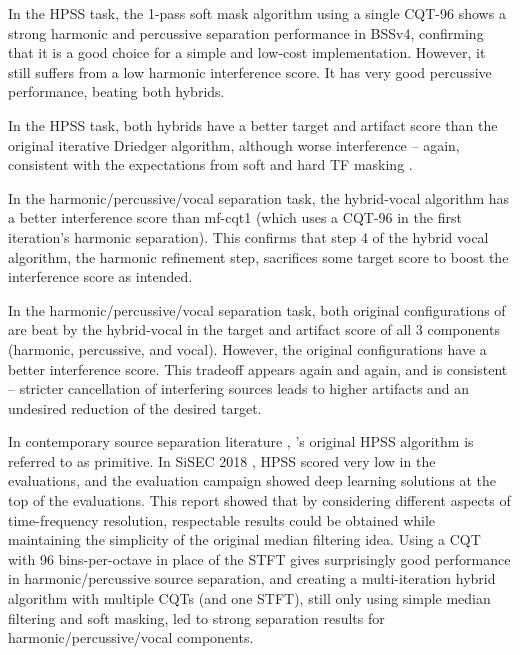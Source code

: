 \documentclass[letter,12pt]{article}
\newenvironment{tight_itemize}{
\begin{itemize}
  \setlength{\itemsep}{0pt}
  \setlength{\parskip}{0pt}
}{\end{itemize}}
\begin{document}
\begin{tight_itemize}
	\item
		In the HPSS task, the 1-pass soft mask algorithm using a single CQT-96 shows a strong harmonic and percussive separation performance in BSSv4, confirming that it is a good choice for a simple and low-cost implementation. However, it still suffers from a low harmonic interference score. It has very good percussive performance, beating both hybrids.
	\item
		In the HPSS task, both hybrids have a better target and artifact score than the original iterative Driedger algorithm, although worse interference -- again, consistent with the expectations from soft and hard TF masking \cite{masking}.
	\item
		In the harmonic/percussive/vocal separation task, the hybrid-vocal algorithm has a better interference score than mf-cqt1 (which uses a CQT-96 in the first iteration's harmonic separation). This confirms that step 4 of the hybrid vocal algorithm, the harmonic refinement step, sacrifices some target score to boost the interference score as intended.
	\item
		In the harmonic/percussive/vocal separation task, both original configurations of \citet{fitzgerald2} are beat by the hybrid-vocal in the target and artifact score of all 3 components (harmonic, percussive, and vocal). However, the original configurations have a better interference score. This tradeoff appears again and again, and is consistent -- stricter cancellation of interfering sources leads to higher artifacts and an undesired reduction of the desired target.
\end{tight_itemize}

In contemporary source separation literature \cite{nussl}, \citet{fitzgerald1}'s original HPSS algorithm is referred to as primitive. In SiSEC 2018 \cite{sigsep2018}, HPSS scored very low in the evaluations, and the evaluation campaign showed deep learning solutions at the top of the evaluations. This report showed that by considering different aspects of time-frequency resolution, respectable results could be obtained while maintaining the simplicity of the original median filtering idea. Using a CQT with 96 bins-per-octave in place of the STFT gives surprisingly good performance in harmonic/percussive source separation, and creating a multi-iteration hybrid algorithm with multiple CQTs (and one STFT), still only using simple median filtering and soft masking, led to strong separation results for harmonic/percussive/vocal components.
\end{document}
